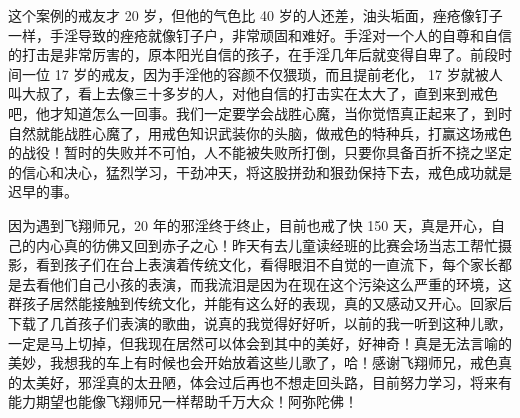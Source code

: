 \begin{case}
    这个案例的戒友才 20 岁，但他的气色比 40 岁的人还差，油头垢面，痤疮像钉子一样，手淫导致的痤疮就像钉子户，非常顽固和难好。手淫对一个人的自尊和自信的打击是非常厉害的，原本阳光自信的孩子，在手淫几年后就变得自卑了。前段时间一位 17 岁的戒友，因为手淫他的容颜不仅猥琐，而且提前老化， 17 岁就被人叫大叔了，看上去像三十多岁的人，对他自信的打击实在太大了，直到来到戒色吧，他才知道怎么一回事。我们一定要学会战胜心魔，当你觉悟真正起来了，到时自然就能战胜心魔了，用戒色知识武装你的头脑，做戒色的特种兵，打赢这场戒色的战役！暂时的失败并不可怕，人不能被失败所打倒，只要你具备百折不挠之坚定的信心和决心，猛烈学习，干劲冲天，将这股拼劲和狠劲保持下去，戒色成功就是迟早的事。
\end{case}

\begin{case}
    因为遇到飞翔师兄，20 年的邪淫终于终止，目前也戒了快 150 天，真是开心，自己的内心真的彷佛又回到赤子之心！昨天有去儿童读经班的比赛会场当志工帮忙摄影，看到孩子们在台上表演着传统文化，看得眼泪不自觉的一直流下，每个家长都是去看他们自己小孩的表演，而我流泪是因为在现在这个污染这么严重的环境，这群孩子居然能接触到传统文化，并能有这么好的表现，真的又感动又开心。回家后下载了几首孩子们表演的歌曲，说真的我觉得好好听，以前的我一听到这种儿歌，一定是马上切掉，但我现在居然可以体会到其中的美好，好神奇！真是无法言喻的美妙，我想我的车上有时候也会开始放着这些儿歌了，哈！感谢飞翔师兄，戒色真的太美好，邪淫真的太丑陋，体会过后再也不想走回头路，目前努力学习，将来有能力期望也能像飞翔师兄一样帮助千万大众！阿弥陀佛！

\end{case}
